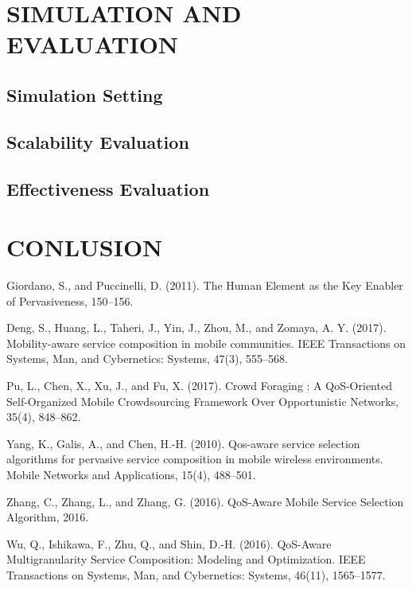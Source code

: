 \documentclass[10pt,journal,compsoc]{IEEEtran}
\begin{document}
\section{SIMULATION AND EVALUATION}
\subsection{Simulation Setting}
\subsection{Scalability Evaluation}
\subsection{Effectiveness Evaluation}
\section{CONLUSION}







\ifCLASSOPTIONcaptionsoff
  \newpage
\fi



\begin{thebibliography}{1}

Giordano, S., and Puccinelli, D. (2011). The Human Element as the Key Enabler of Pervasiveness, 150–156.

\bibitem{}
Deng, S., Huang, L., Taheri, J., Yin, J., Zhou, M., and Zomaya, A. Y. (2017). Mobility-aware service composition in mobile communities. IEEE Transactions on Systems, Man, and Cybernetics: Systems, 47(3), 555–568.

\bibitem{}
Pu, L., Chen, X., Xu, J., and Fu, X. (2017). Crowd Foraging : A QoS-Oriented Self-Organized Mobile Crowdsourcing Framework Over Opportunistic Networks, 35(4), 848–862.

\bibitem{}
Yang, K., Galis, A., and Chen, H.-H. (2010). Qos-aware service selection algorithms for pervasive service composition in mobile wireless environments. Mobile Networks and Applications, 15(4), 488–501.

\bibitem{}
Zhang, C., Zhang, L., and Zhang, G. (2016). QoS-Aware Mobile Service Selection Algorithm, 2016.

\bibitem{}
Wu, Q., Ishikawa, F., Zhu, Q., and Shin, D.-H. (2016). QoS-Aware Multigranularity Service Composition: Modeling and Optimization. IEEE Transactions on Systems, Man, and Cybernetics: Systems, 46(11), 1565–1577.

\end{thebibliography}
\end{document}

